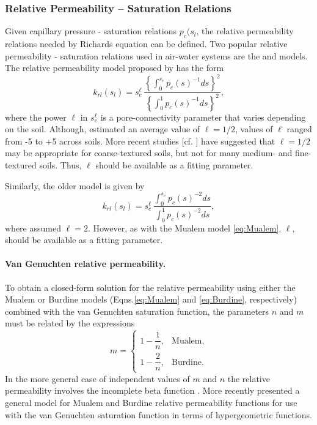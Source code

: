 \subsubsection{Relative Permeability -- Saturation Relations}
\label{sec:richards-relative-permeability}

Given capillary pressure - saturation relations $p_c(s_l$, 
the relative permeability relations needed by Richards equation can be defined.  
Two popular relative permeability - saturation relations used in air-water 
systems are the \citet{mualem1976new} and \citet{burdine1953relative} models.
The relative permeability model proposed by \citet{mualem1976new} has the form
\begin{equation} \label{eq:Mualem}
  k_{rl}(s_l) 
  = 
  s_e^{\ell} \, 
  \frac{ \left\{ \displaystyle\int_0^{s_e} p_c(s)^{-1} ds \right\}^2 }
  { \left\{ \displaystyle\int_0^{1} p_c(s)^{-1} ds \right\}^2 },
\end{equation}
where the power $\ell$ in $s_e^\ell$ is a pore-connectivity parameter that varies 
depending on the soil. 
Although, \citet{mualem1976new} estimated an average value of
$\ell=1/2$, values of $\ell$ ranged from -5 to +5 across soils. More recent studies
[cf. \citet{vanG_retc_1991}] have suggested that $\ell=1/2$ may be
appropriate for coarse-textured soils, but not for many medium- and
fine-textured soils. Thus, $\ell$ should be available as a fitting parameter.

Similarly, the older \citet{burdine1953relative} model is given by
\begin{equation}
\label{eq:Burdine}
  k_{rl}(s_l) = s_e^{\ell} \, 
    \frac{ \displaystyle\int_0^{s_e} p_c(s)^{-2} ds }
         { \displaystyle\int_0^{1} p_c(s)^{-2} ds },
\end{equation}
where \citet{burdine1953relative} assumed $\ell=2$. However, as with
the Mualem model \eqref{eq:Mualem}, $\ell$, should be available as a
fitting parameter.


\paragraph{Van Genuchten relative permeability.}
To obtain a closed-form solution for the relative permeability using
either the Mualem or Burdine models (Eqns.\eqref{eq:Mualem} and
\eqref{eq:Burdine}, respectively) combined with the van Genuchten
saturation function, the parameters $n$ and $m$ must be related by the
expressions
\begin{equation}
\label{eq:lambda} 
m = \left\{
  \begin{array}{ll}
    1 - \dfrac{1}{n}, & \text{Mualem},\\[9pt]
    1 - \dfrac{2}{n}, & \text{Burdine}.
  \end{array}
\right.
\end{equation}
In the more general case of independent values of $m$ and $n$ the
relative permeability involves the incomplete beta function \citep{vangenuchten1985}. 
More recently \citep{douradoneto2011} presented a general model for Mualem and 
Burdine relative permeability functions for use with the van Genuchten saturation 
function in terms of hypergeometric functions.


